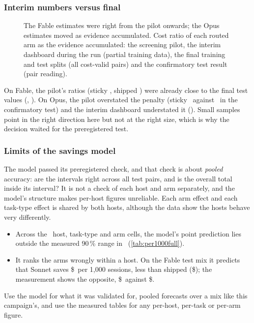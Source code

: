 \subsubsection{Interim numbers versus final}\label{vt:sec:interim}

\begin{figure}[tbp]
\centering
{}\par\smallskip

\caption{The Fable estimates were right from the pilot onwards; the Opus estimates moved as evidence accumulated. Cost ratio of each routed arm as the evidence accumulated: the screening pilot, the interim dashboard
during the run (partial training data), the final training and test splits (all cost-valid pairs) and the
confirmatory test result (pair reading).}
\label{vt:fig:interim}
\end{figure}

On Fable, the pilot's ratios (sticky \PilotFableSticky, shipped \PilotFableShipped) were already close to the
final test values (\FinalTestFableSticky, \FinalTestFableShipped). On Opus, the pilot overstated the
penalty (sticky \PilotOpusSticky\ against \CfOpusStickyPairTwo\ in the confirmatory test) and the interim
dashboard understated it (\InterimOpusSticky). Small samples point in the right direction here but not at the
right size, which is why the decision waited for the preregistered test.

\subsubsection{Limits of the savings model}\label{vt:sec:modellimits}

The model passed its preregistered check, and that check is about \emph{pooled} accuracy: are the intervals
right across all test pairs, and is the overall total inside its interval? It is not a check of each host and
arm separately, and the model's structure makes per-host figures unreliable. Each arm effect and each
task-type effect is shared by both hosts, although the data show the hosts behave very differently.
\begin{itemize}
  \item Across the \ModelCells\ host, task-type and arm cells, the model's point prediction lies outside the
    measured 90\,\% range in \ModelOutside\ (\cref{tab:per1000full}).
  \item It ranks the arms wrongly within a host. On the Fable test mix it predicts that Sonnet saves
    \$\TestMixFableSonnetModel\ per 1,000 sessions, less than shipped (\$\TestMixFableShippedModel); the
    measurement shows the opposite, \$\TestMixFableSonnetObs\ against \$\TestMixFableShippedObs.
\end{itemize}
Use the model for what it was validated for, pooled forecasts over a mix like this campaign's, and use the
measured tables for any per-host, per-task or per-arm figure.
